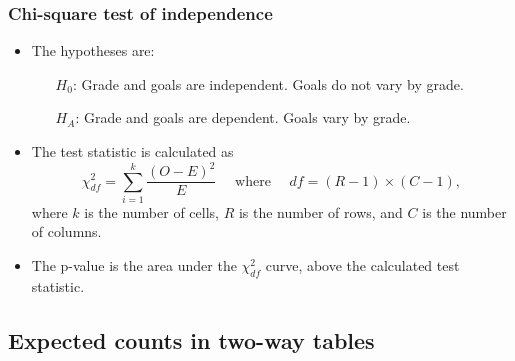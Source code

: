 \documentclass[notes,11pt, aspectratio=169]{beamer}
\begin{document}

\begin{frame}
\frametitle{Chi-square test of independence}

\begin{itemize}
\item The hypotheses are:
\begin{itemize}
\item[$H_0$:] Grade and goals are independent. Goals do not vary by grade.
\item[$H_A$:] Grade and goals are dependent. Goals vary by grade.
\end{itemize}

\pause

\item The test statistic is calculated as
\[ \chi^2_{df} = \sum_{i = 1}^{k} \frac{(O - E)^2}{E} \quad \text{ where } \quad df = (R - 1) \times (C - 1), \]
where $k$ is the number of cells, $R$ is the number of rows, and $C$ is the number of columns.


\pause

\item The p-value is the area under the $\chi^2_{df}$ curve, above the calculated test statistic.

\end{itemize}


\end{frame}


\subsection{Expected counts in two-way tables}

\end{document}
